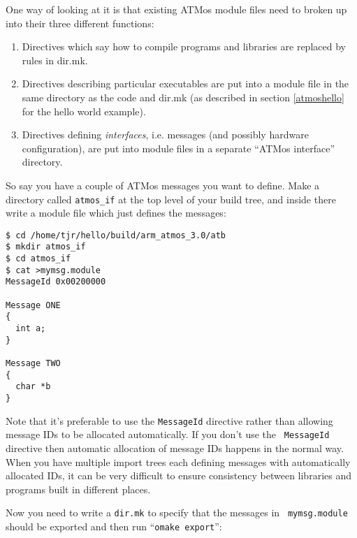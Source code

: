 \documentclass[11pt,twoside,onecolumn]{article}
\begin{document}
One way of looking at it is that existing ATMos module files need to broken up
into their three different functions:

\begin{enumerate}
\item Directives which say how to compile programs and libraries are replaced
by rules in dir.mk.
\item Directives describing particular executables are put into a module file
in the same directory as the code and dir.mk (as described in section
\ref{atmoshello} for the hello world example).
\item Directives defining {\em interfaces}, i.e. messages (and possibly
hardware configuration), are put into module files in a separate ``ATMos
interface'' directory.
\end{enumerate}

So say you have a couple of ATMos messages you want to define.  Make a
directory called \verb|atmos_if| at the top level of your build tree, and
inside there write a module file which just defines the messages:

{\footnotesize \begin{verbatim}
$ cd /home/tjr/hello/build/arm_atmos_3.0/atb
$ mkdir atmos_if
$ cd atmos_if
$ cat >mymsg.module
MessageId 0x00200000

Message ONE
{
  int a;
}

Message TWO
{
  char *b
}
\end{verbatim}}

Note that it's preferable to use the {\tt MessageId} directive rather than
allowing message IDs to be allocated automatically.  If you don't use the {\tt
MessageId} directive then automatic allocation of message IDs happens in the
normal way.  When you have multiple import trees each defining messages with
automatically allocated IDs, it can be very difficult to ensure consistency
between libraries and programs built in different places.

Now you need to write a {\tt dir.mk} to specify that the messages in {\tt
mymsg.module} should be exported and then run ``{\tt omake export}'':
\end{document}
